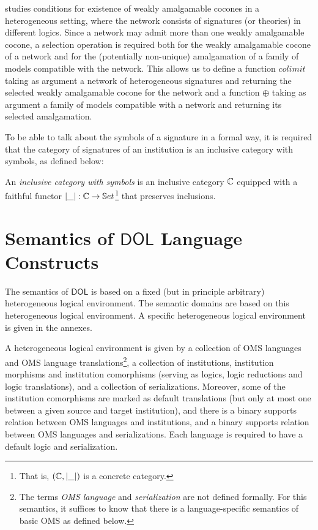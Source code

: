 \documentclass[10pt,fleqn,final]{scrreprt}
\newcommand*{\termref}[1]{\index{#1}#1\xspace}
\newcommand*{\DOL}{\ensuremath{\mathsf{DOL}}\xspace}
\newcommand{\sclause}[1]{\section{#1}}
\newenvironment{definitions}[0]{\medskip }{}
\begin{document}
\begin{definitions}
\cite{weakcol} studies conditions for existence of weakly amalgamable cocones
in a heterogeneous setting, where the network consists of signatures (or theories)
in different logics. Since a network may admit more than one weakly amalgamable cocone,
a selection operation is required both for the weakly amalgamable cocone of a network 
and for the (potentially non-unique) amalgamation of a family of models compatible with the
network. This allows us to define a function
$colimit$ taking as argument a network of heterogeneous signatures and
returning the selected weakly amalgamable cocone for the network and
a function $\oplus$ taking as argument a family of models compatible with a network
and returning its selected amalgamation.

 To be able to talk about the symbols of a signature in a formal way, it is required that the category of signatures of an institution is 
an inclusive category with symbols, as defined below:
\begin{definition}
An \emph{inclusive category with symbols} is an inclusive category
$\mathbb{C}$ equipped with a faithful functor $|\_|:\mathbb{C}\to\mathbb{S}et$\footnote{That is,
$(\mathbb{C},|\_|)$ is a concrete category.} that preserves
inclusions.
\end{definition}

\sclause{Semantics of \DOL Language Constructs}\label{c:direct-sematics}

The semantics of \DOL is based on a fixed (but in principle arbitrary) heterogeneous logical 
environment.  The semantic domains are based on this heterogeneous logical environment. 
A specific heterogeneous logical environment is given in the annexes.

A heterogeneous logical environment is given by a collection of
OMS languages and OMS language translations\footnote{The
  terms \emph{OMS language} and \emph{serialization} are not
  defined formally. For this semantics, it suffices to know that there
  is a language-specific semantics of basic OMS as defined
  below.}, a collection of institutions, \termref{institution} morphisms and
institution comorphisms (serving as logics, logic reductions and logic
translations), and a collection of serializations. Moreover, some of the institution comorphisms are marked as default translations (but only at most one between a given source and target institution), and there is
a binary supports relation between OMS languages and institutions,
and a binary supports relation between OMS languages and
serializations. 
 Each language is required to have a default logic and serialization.



\end{definitions}
\end{document}
